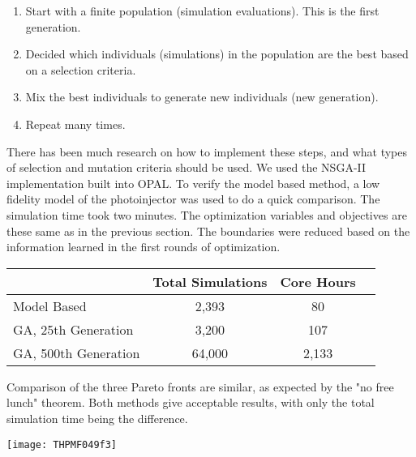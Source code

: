 \documentclass[portrait,final,paperwidth=92cm, paperheight=152cm,  fontscale=0.277]{baposter}
\begin{document}
\begin{poster}
{\begin{center}
	\begin{minipage}{0.5\textwidth}
			\begin{enumerate}
			\itemsep0em
			\item Start with a finite population (simulation evaluations). This is the first generation.
			\item Decided which individuals (simulations) in the population 
			are the best based on a selection criteria.
			\item Mix the best individuals to generate new individuals (new generation).
			\item Repeat many times.
		\end{enumerate}
		There has been much research on how to implement these steps, 
		and what types of selection and mutation criteria should be used.
		We used the \mbox{NSGA-II} implementation built into OPAL.
		To verify the model based method, a low fidelity model 
		of the photoinjector was used to do a quick comparison.
		The simulation time took two minutes. 
		The optimization variables
		and objectives are these same as in the previous section.
		The boundaries were reduced based on the information 
		learned in the first rounds of optimization.
		
		\vspace{4em}
		
\begin{singlespace}
	\centering
		\begin{tabular}{ l *{3}{c}}
		\hline 
		\textbf{} & \textbf{Total Simulations} & \textbf{Core Hours}  \\ 
		\hline 
		Model Based & 2,393  & 80 \\
		GA, 25th Generation  & 3,200  & 107 \\
		GA, 500th Generation & 64,000 & 2,133 \\
		\hline%
	\end{tabular}
	
\end{singlespace}

\vspace{1em}
	Comparison of the three Pareto fronts are similar, 
	as expected by the "no free lunch" theorem. Both methods give 
	acceptable results, with only the total simulation time being 
	the difference. 
	\end{minipage}	%
	\begin{minipage}{0.48\textwidth}
		\centering
		\texttt{[image: THPMF049f3]}
		

\end{minipage}
\end{center}}
\end{poster}
\end{document}
